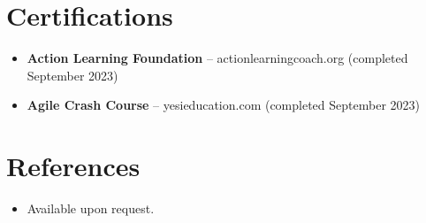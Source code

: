 \documentclass[11pt,a4paper,sans]{moderncv}
\begin{document}
\section{Certifications}
\vspace{1pt}
\begin{itemize}
\item \textbf{Action Learning Foundation} -- actionlearningcoach.org (completed September 2023)
\item \textbf{Agile Crash Course} -- yesieducation.com (completed September 2023)
\end{itemize}


\section{References}
\vspace{1pt}
\begin{itemize}
\item Available upon request.
\end{itemize}
\end{document}
